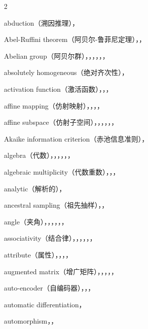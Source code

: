 \begin{multicols}{2}
\medskip{}\par\smallskip
\noindent abduction（溯因推理），\par
\noindent Abel-Ruffini theorem（阿贝尔-鲁菲尼定理），，\par
\noindent Abelian group（阿贝尔群），，，，，，\par
\noindent absolutely homogeneous（绝对齐次性），\par
\noindent activation function（激活函数），，，\par
\noindent affine mapping（仿射映射），，，，\par
\noindent affine subspace（仿射子空间），，，，，，\par
\noindent Akaike information criterion（赤池信息准则），\par
\noindent algebra（代数），，，，，，\par
\noindent algebraic multiplicity（代数重数），，，\par
\noindent analytic（解析的），\par
\noindent ancestral sampling（祖先抽样），，\par
\noindent angle（夹角），，，，，，\par
\noindent associativity（结合律），，，，，，\par
\noindent attribute（属性），，，，\par
\noindent augmented matrix（增广矩阵），，，，，\par
\noindent auto-encoder（自编码器），，，\par
\noindent automatic differentiation，\par
\noindent automorphism，，\par


\end{multicols}
